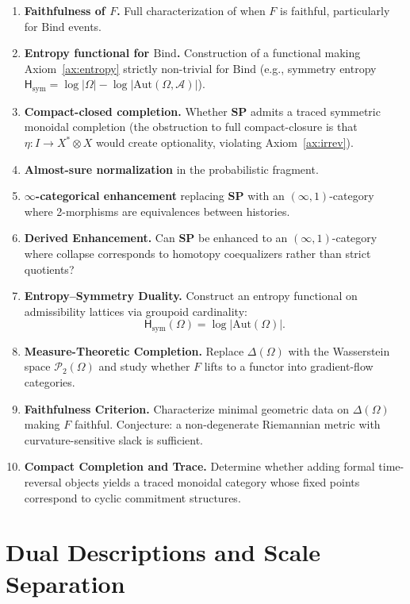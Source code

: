 \documentclass[12pt,a4paper]{article}
\theoremstyle{definition}
\theoremstyle{remark}
\newcommand{\SP}{\mathbf{SP}}
\newcommand{\Bind}{\ensuremath{\mathrm{Bind}}}
\newcommand{\tensor}{\otimes}
\newcommand{\unit}{I}
\begin{document}
\begin{enumerate}
\item \textbf{Faithfulness of $F$.} Full characterization of when $F$ is faithful,
  particularly for $\Bind$ events.
\item \textbf{Entropy functional for $\Bind$.} Construction of a functional making
  Axiom~\ref{ax:entropy} strictly non-trivial for $\Bind$ (e.g., symmetry entropy
  $\mathsf{H}_{\mathrm{sym}}=\log|\Omega|-\log|\mathrm{Aut}(\Omega,\mathcal{A})|$).
\item \textbf{Compact-closed completion.} Whether $\SP$ admits a traced symmetric
  monoidal completion (the obstruction to full compact-closure is that $\eta:\unit\to
  X^*\tensor X$ would create optionality, violating Axiom~\ref{ax:irrev}).
\item \textbf{Almost-sure normalization} in the probabilistic fragment.
\item \textbf{$\infty$-categorical enhancement} replacing $\SP$ with an
  $(\infty,1)$-category where 2-morphisms are equivalences between histories.
\item \textbf{Derived Enhancement.}
Can $\SP$ be enhanced to an $(\infty,1)$-category where collapse corresponds to homotopy coequalizers rather than strict quotients?
\item \textbf{Entropy--Symmetry Duality.}
Construct an entropy functional on admissibility lattices via groupoid cardinality:
\[
  \mathsf{H}_{\mathrm{sym}}(\Omega) = \log |\mathrm{Aut}(\Omega)|.
\]
\item \textbf{Measure-Theoretic Completion.}
Replace $\Delta(\Omega)$ with the Wasserstein space $\mathcal{P}_2(\Omega)$ and study whether $F$ lifts to a functor into gradient-flow categories.
\item \textbf{Faithfulness Criterion.}
Characterize minimal geometric data on $\Delta(\Omega)$ making $F$ faithful. Conjecture: a non-degenerate Riemannian metric with curvature-sensitive slack is sufficient.
\item \textbf{Compact Completion and Trace.}
Determine whether adding formal time-reversal objects yields a traced monoidal category whose fixed points correspond to cyclic commitment structures.
\end{enumerate}

\section{Dual Descriptions and Scale Separation}
\label{sec:dual}
\end{document}
